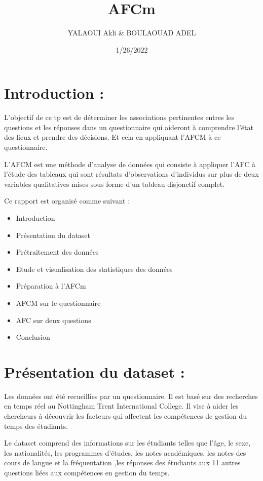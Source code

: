 \documentclass[
]{article}
\title{AFCm}
\author{YALAOUI Akli \& BOULAOUAD ADEL}
\date{1/26/2022}
\providecommand{\tightlist}{%
  \setlength{\itemsep}{0pt}\setlength{\parskip}{0pt}}
\begin{document}
\maketitle

\hypertarget{introduction}{%
\section{Introduction :}\label{introduction}}

L'objectif de ce tp est de déterminer les associations pertinentes
entres les questions et les réponses dans un questionnaire qui aideront
à comprendre l'état des lieux et prendre des décisions. Et cela en
appliquant l'AFCM à ce questionnaire.

L'AFCM est une méthode d'analyse de données qui consiste à appliquer
l'AFC à l'étude des tableaux qui sont résultats d'observations
d'individus sur plus de deux variables qualitatives mises sous forme
d'un tableau disjonctif complet.

Ce rapport est organisé comme suivant :

\begin{itemize}
\tightlist
\item
  Introduction
\item
  Présentation du dataset
\item
  Prétraitement des données
\item
  Etude et visualisation des statistiques des données
\item
  Préparation à l'AFCm
\item
  AFCM sur le questionnaire
\item
  AFC sur deux questions
\item
  Conclusion
\end{itemize}

\hypertarget{pruxe9sentation-du-dataset}{%
\section{Présentation du dataset :}\label{pruxe9sentation-du-dataset}}

Les données ont été recueillies par un questionnaire. Il est basé sur
des recherches en temps réel au Nottingham Trent International College.
Il vise à aider les chercheurs à découvrir les facteurs qui affectent
les compétences de gestion du temps des étudiants.

Le dataset comprend des informations sur les étudiants telles que l'âge,
le sexe, les nationalités, les programmes d'études, les notes
académiques, les notes des cours de langue et la fréquentation ,les
réponses des étudiants aux 11 autres questions liées aux compétences en
gestion du temps.
\end{document}
